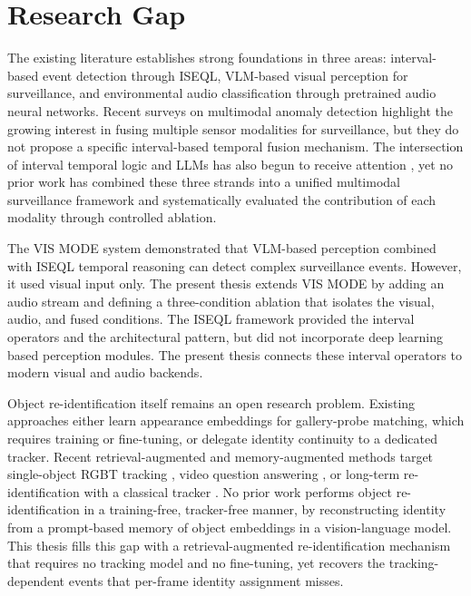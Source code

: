 \section{Research Gap}

The existing literature establishes strong foundations in three areas: interval-based event detection through ISEQL, VLM-based visual perception for surveillance, and environmental audio classification through pretrained audio neural networks. Recent surveys on multimodal anomaly detection \citep{barbosa2025multimodalvad} highlight the growing interest in fusing multiple sensor modalities for surveillance, but they do not propose a specific interval-based temporal fusion mechanism. The intersection of interval temporal logic and LLMs has also begun to receive attention \citep{bellodi2025intervalitl}, yet no prior work has combined these three strands into a unified multimodal surveillance framework and systematically evaluated the contribution of each modality through controlled ablation.

The VIS MODE system \citep{crescitelli2026eccv} demonstrated that VLM-based perception combined with ISEQL temporal reasoning can detect complex surveillance events. However, it used visual input only. The present thesis extends VIS MODE by adding an audio stream and defining a three-condition ablation that isolates the visual, audio, and fused conditions. The ISEQL framework \citep{helmer2016highlevel, persia2017interactive} provided the interval operators and the architectural pattern, but did not incorporate deep learning based perception modules. The present thesis connects these interval operators to modern visual and audio backends.

Object re-identification itself remains an open research problem. Existing approaches either learn appearance embeddings for gallery-probe matching, which requires training or fine-tuning, or delegate identity continuity to a dedicated tracker. Recent retrieval-augmented and memory-augmented methods target single-object RGBT tracking \citep{li2026ragtrack}, video question answering \citep{malik2025ravu, fan2024videoagent}, or long-term re-identification with a classical tracker \citep{diazpereda2026remind}. No prior work performs object re-identification in a training-free, tracker-free manner, by reconstructing identity from a prompt-based memory of object embeddings in a vision-language model. This thesis fills this gap with a retrieval-augmented re-identification mechanism that requires no tracking model and no fine-tuning, yet recovers the tracking-dependent events that per-frame identity assignment misses.

